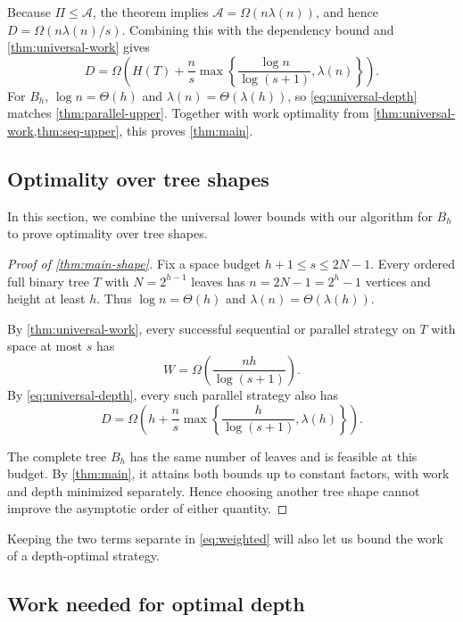 \documentclass[11pt]{article}
\theoremstyle{definition}
\theoremstyle{remark}
\newcommand{\Area}{\mathcal A}
\begin{document}
Because $\Pi\le\Area$, the theorem implies
$\Area=\Omega(n\lambda(n))$, and hence
$D=\Omega(n\lambda(n)/s)$. Combining this with the dependency
bound and \cref{thm:universal-work} gives
\begin{equation}
D=\Omega\!\left(H(T)+\frac ns\max\!\left\{\frac{\log n}{\log(s+1)},\lambda(n)\right\}\right).
\label{eq:universal-depth}
\end{equation}
For $B_h$, $\log n=\Theta(h)$ and
$\lambda(n)=\Theta(\lambda(h))$, so \cref{eq:universal-depth}
matches \cref{thm:parallel-upper}. Together with work optimality
from \cref{thm:universal-work,thm:seq-upper}, this proves \cref{thm:main}.

\subsection{Optimality over tree shapes}
\label{sec:tree-shape}

In this section, we combine the universal lower bounds with
our algorithm for $B_h$ to prove optimality over tree shapes.

\begin{proof}[Proof of \cref{thm:main-shape}]
Fix a space budget $h+1\le s\le2N-1$.
Every ordered full binary tree $T$ with $N=2^{h-1}$ leaves
has $n=2N-1=2^h-1$ vertices and height at least $h$.
Thus $\log n=\Theta(h)$ and
$\lambda(n)=\Theta(\lambda(h))$.

By \cref{thm:universal-work}, every successful sequential
or parallel strategy on $T$ with space at most $s$ has
\begin{equation}
W=\Omega\!\left(\frac{nh}{\log(s+1)}\right).
\end{equation}
By \cref{eq:universal-depth}, every such parallel strategy
also has
\begin{equation}
D=\Omega\!\left(h+\frac ns\max\!\left\{\frac{h}{\log(s+1)},\lambda(h)\right\}\right).
\end{equation}

The complete tree $B_h$ has the same number of leaves and
is feasible at this budget. By \cref{thm:main}, it attains
both bounds up to constant factors, with work and depth
minimized separately. Hence choosing another tree shape
cannot improve the asymptotic order of either quantity.
\end{proof}

Keeping the two terms separate in \cref{eq:weighted} will also let us bound the work of a depth-optimal strategy.


\subsection{Work needed for optimal depth}
\label{sec:separation}
\end{document}
